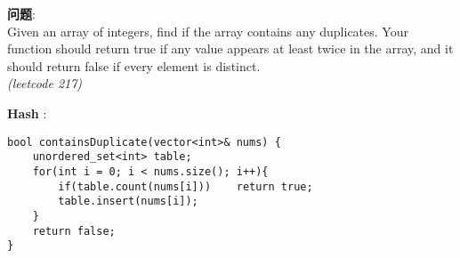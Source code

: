     
\begin{description}
    \item{\textbf{问题}}:\\
Given an array of integers, find if the array contains any duplicates. Your function should return true if any value appears at least twice in the array, and it should return false if every element is distinct.\\
\textit{(leetcode 217)}
    \item{\textbf{Hash}} : 
    \begin{lstlisting}
bool containsDuplicate(vector<int>& nums) {
	unordered_set<int> table;
	for(int i = 0; i < nums.size(); i++){
		if(table.count(nums[i]))	return true;
		table.insert(nums[i]);
	}
	return false;
}
    \end{lstlisting}
\end{description}
